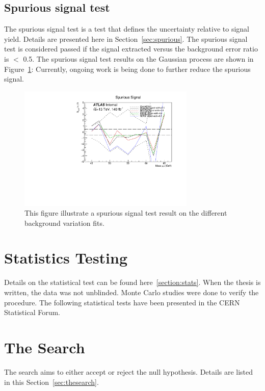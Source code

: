 \subsection{Spurious signal test}

The spurious signal test is a test that defines the uncertainty relative to signal yield. Details are presented here in Section~\ref{sec:spurious}.
The spurious signal test is considered passed if the signal extracted versus the background error ratio is $<$ 0.5.
The spurious signal test results on the Gaussian process are shown in Figure~\ref{fig:spurious}:
Currently, ongoing work is being done to further reduce the spurious signal.

\begin{figure}[!htb]
    \begin{center}
        \includegraphics[width=0.75\textwidth]{figures/chapter_dimuon/spurious}        
        \caption{
        This figure illustrate a spurious signal test result on the different background variation fits.}
        \label{fig:spurious}
    \end{center}
\end{figure}
\FloatBarrier

\section{Statistics Testing}
Details on the statistical test can be found here~\ref{section:stats}. When the thesis is written, the data was not unblinded. Monte Carlo studies were done to verify the procedure. The following statistical tests have been presented in the CERN Statistical Forum.

\section{The Search}
The search aims to either accept or reject the null hypothesis. Details are listed in this Section~\ref{sec:thesearch}.


